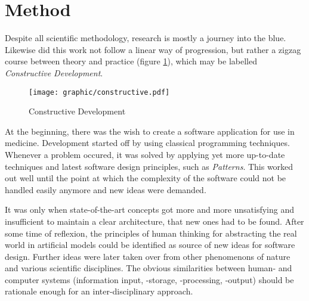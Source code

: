 %
%
%
%
%
%
%

\section{Method}
\label{method_heading}

Despite all scientific methodology, research is mostly a journey into the blue.
Likewise did this work not follow a linear way of progression, but rather a
zigzag course between theory and practice (figure \ref{constructive_figure}),
which may be labelled \emph{Constructive Development}.

\begin{figure}[ht]
    \begin{center}
        \texttt{[image: graphic/constructive.pdf]}
        \caption{Constructive Development}
        \label{constructive_figure}
    \end{center}
\end{figure}

At the beginning, there was the wish to create a software application for use
in medicine. Development started off by using classical programming techniques.
Whenever a problem occured, it was solved by applying yet more up-to-date
techniques and latest software design principles, such as \emph{Patterns}. This
worked out well until the point at which the complexity of the software could
not be handled easily anymore and new ideas were demanded.

It was only when state-of-the-art concepts got more and more unsatisfying and
insufficient to maintain a clear architecture, that new ones had to be found.
After some time of reflexion, the principles of human thinking for abstracting
the real world in artificial models could be identified as source of new ideas
for software design. Further ideas were later taken over from other phenomenons
of nature and various scientific disciplines. The obvious similarities between
human- and computer systems (information input, -storage, -processing, -output)
should be rationale enough for an inter-disciplinary approach.

